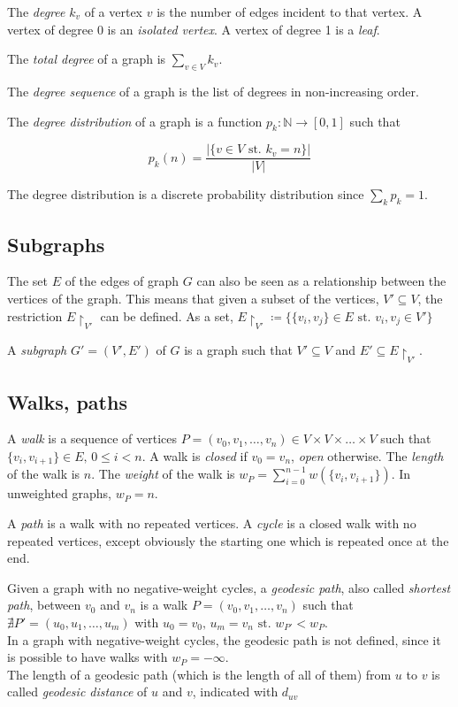 \documentclass[a4paper,11pt,twoside,openleft]{memoir}
\newcommand{\st}{\text{ st. }}
\begin{document}
The \emph{degree} $k_v$ of a vertex $v$ is the number of edges incident
to that vertex. A vertex of degree 0 is an \emph{isolated vertex}. A
vertex of degree 1 is a \emph{leaf}.

The \emph{total degree} of a graph is $\sum_{v \in V} k_v$.

The \emph{degree sequence} of a graph is the list of degrees in
non-increasing order.

The \emph{degree distribution} of a graph is a function
$p_k: \mathbb{N} \rightarrow [0, 1]$ such that

\begin{equation*}
p_k(n) = \frac{\left\vert{ \{v \in V \st k_v = n\} }\right\vert}{|V|}
\end{equation*}

The degree distribution is a discrete probability distribution since
$\sum_{k} p_k = 1$.

\subsection{Subgraphs}\label{subgraphs}

The set $E$ of the edges of graph $G$ can also be seen as a relationship
between the vertices of the graph. This means that given a subset of the
vertices, $V' \subseteq V$, the restriction $E\restriction_{V'}$ can be
defined. As a set, $E\restriction_{V'} \coloneqq
\{\{v_i, v_j\} \in E \st v_i,v_j \in V'\}$

A \emph{subgraph} $G' = (V', E')$ of $G$ is a graph such that
$V' \subseteq V$ and $E' \subseteq E\restriction_{V'}$.

\subsection{Walks, paths}\label{walks-paths}

A \emph{walk} is a sequence of vertices
$P = (v_0, v_1, \ldots, v_n) \in V \times V \times \ldots \times V$ such
that $\{v_i, v_{i+1}\} \in E,\, 0 \leq i < n$. A walk is \emph{closed} if
$v_0 = v_n$, \emph{open} otherwise. The \emph{length} of the walk is
$n$. The \emph{weight} of the walk is
$w_P = \sum_{i=0}^{n-1} w(\{v_i, v_{i+1}\})$. In unweighted graphs, $w_P = n$.

A \emph{path} is a walk with no repeated vertices. A \emph{cycle} is a
closed walk with no repeated vertices, except obviously the starting one
which is repeated once at the end.

Given a graph with no negative-weight cycles, a \emph{geodesic path},
also called \emph{shortest path}, between $v_0$ and $v_n$ is a walk
$P = (v_0, v_1, \ldots, v_n)$ such that
$\nexists P' = (u_0, u_1, \ldots, u_m)$ with
$u_0 = v_0,\, u_m = v_n \st w_{P'} < w_P$.\\
In a graph with negative-weight cycles, the
geodesic path is not defined, since it is possible to have walks with
$w_P = -\infty$.\\
The length of a geodesic path (which is the length of
all of them) from $u$ to $v$ is called \emph{geodesic distance} of $u$
and $v$, indicated with $d_{uv}$
\end{document}
